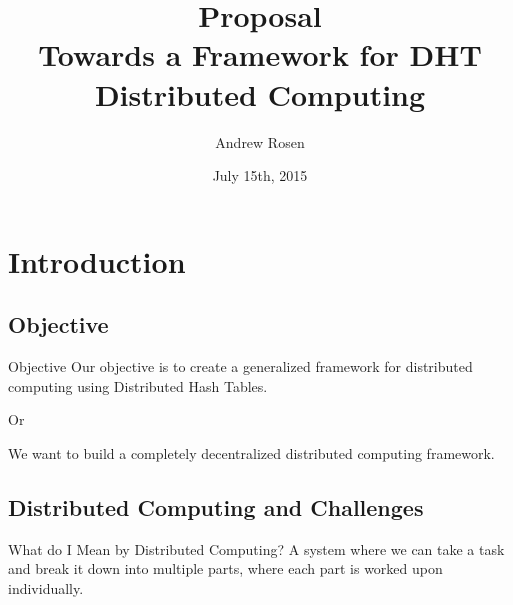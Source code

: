 \documentclass[11pt]{beamer}
\author{Andrew Rosen}
\title[DHT Distributed Computing]{Proposal \\ Towards a Framework for DHT Distributed Computing}
\institute{Georgia State University}
\date{July 15th, 2015}
\begin{document}
	
	
	
\maketitle


\section{Introduction}


\subsection{Objective}
\begin{frame}{Objective}
Our objective is to create a generalized framework for distributed computing using Distributed Hash Tables.

\pause
\begin{center}
	Or
\end{center}

\pause
We want to build a completely decentralized distributed computing framework.
\end{frame}


\subsection{Distributed Computing and Challenges}

\begin{frame}{What do I Mean by Distributed Computing?}
	A system where we can take a task and break it down into multiple parts, where each part is worked upon individually.
\end{frame}

\end{document}
